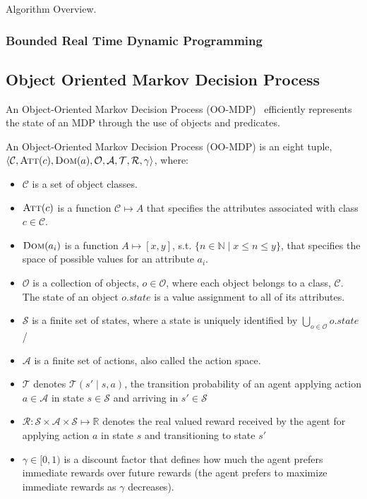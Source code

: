 \documentclass[11pt]{article}
\begin{document}
Algorithm Overview.

\subsubsection{Bounded Real Time Dynamic Programming}



\subsection{Object Oriented Markov Decision Process}


An Object-Oriented Markov Decision Process (OO-MDP)~\cite{diuk08} efficiently represents the state
of an MDP through the use of objects and predicates. \\

{ An \textup{Object-Oriented Markov Decision Process (OO-MDP)} is an eight tuple, $\langle \mathcal{C}, \textsc{Att}(c), \textsc{Dom}(a), \mathcal{O},
\mathcal{A}, \mathcal{T}, \mathcal{R}, \gamma \rangle$, where:

\begin{itemize}
\item $\mathcal{C}$ is a set of object classes.
\item $\textsc{Att}(c)$ is a function $\mathcal{C} \mapsto A$ that specifies the attributes associated with class $c \in \mathcal{C}$.
\item $\textsc{Dom}(a_i)$ is a function $A \mapsto [x,y]$, s.t. $\{n \in \mathbb{N} \mid x \leq n \leq y \}$, that specifies the space of possible values for an attribute $a_i$.
\item $\mathcal{O}$ is a collection of objects, $o \in \mathcal{O}$, where each object belongs to a class, $\mathcal{C}$. The \textup{state} of an object $o.state$ is a value assignment to all of its attributes.
\item $\mathcal{S}$ is a finite set of states, where a state is uniquely identified by $\bigcup_{o \in \mathcal{O}} o.state$/
\item $\mathcal{A}$ is a finite set of actions, also called the \textup{action space}.
\item $\mathcal{T}$ denotes $\mathcal{T}(s' \mid s,a)$, the
transition probability of an agent applying action $a \in \mathcal{A}$
in state $s \in \mathcal{S}$ and arriving in $s' \in \mathcal{S}$
\item $\mathcal{R} : \mathcal{S} \times \mathcal{A} \times \mathcal{S} \mapsto \mathbb{R}$ denotes the real valued reward received by the agent for
applying action $a$ in state $s$ and transitioning to state $s'$
\item $\gamma \in [0, 1)$ is a discount factor that defines how much the
  agent prefers immediate rewards over future rewards (the agent
  prefers to maximize immediate rewards as $\gamma$ decreases).
\end{itemize}}
\end{document}
